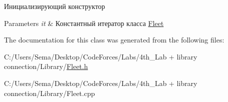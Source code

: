 Инициализирующий конструктор 


\begin{DoxyParams}{Parameters}
{\em it} & Константный итератор класса \mbox{\hyperlink{class_aircraft_carrier_group_1_1_fleet}{Fleet}} \\
\hline
\end{DoxyParams}


The documentation for this class was generated from the following files\+:\begin{DoxyCompactItemize}
\item 
C\+:/\+Users/\+Sema/\+Desktop/\+Code\+Forces/\+Labs/4th\+\_\+\+Lab + library connection/\+Library/\mbox{\hyperlink{_fleet_8h}{Fleet.\+h}}\item 
C\+:/\+Users/\+Sema/\+Desktop/\+Code\+Forces/\+Labs/4th\+\_\+\+Lab + library connection/\+Library/Fleet.\+cpp\end{DoxyCompactItemize}
